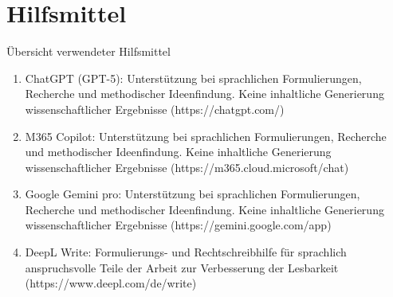 
\section*{Hilfsmittel}
Übersicht verwendeter Hilfsmittel

\begin{enumerate}
    \item ChatGPT (GPT-5): Unterstützung bei sprachlichen Formulierungen, Recherche
und methodischer Ideenfindung. Keine inhaltliche Generierung wissenschaftlicher
Ergebnisse (https://chatgpt.com/)
    \item M365 Copilot: Unterstützung bei sprachlichen Formulierungen, Recherche und
methodischer Ideenfindung. Keine inhaltliche Generierung wissenschaftlicher Ergebnisse (https://m365.cloud.microsoft/chat)
    \item Google Gemini pro: Unterstützung bei sprachlichen Formulierungen, Recherche
und methodischer Ideenfindung. Keine inhaltliche Generierung wissenschaftlicher
Ergebnisse (https://gemini.google.com/app)
    \item DeepL Write: Formulierungs- und Rechtschreibhilfe für sprachlich anspruchsvolle
Teile der Arbeit zur Verbesserung der Lesbarkeit (https://www.deepl.com/de/write)
\end{enumerate}